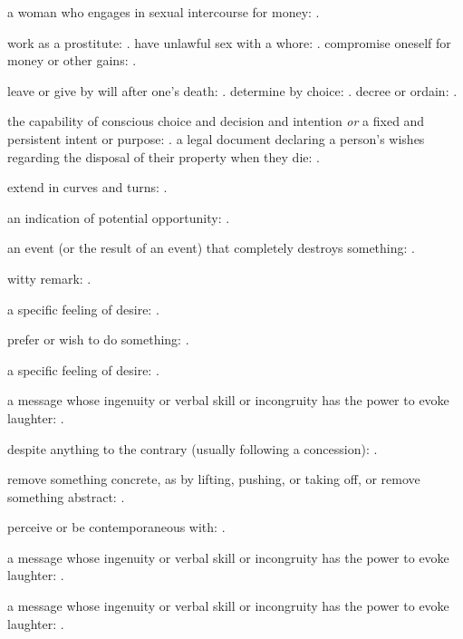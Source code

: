   a woman who engages in sexual intercourse for money: .

  work as a prostitute: . have unlawful sex with a whore: . compromise oneself for money or other gains: .

  leave or give by will after one's death: . determine by choice: . decree or ordain: .

  the capability of conscious choice and decision and intention \textit{or} a fixed and persistent intent or purpose: . a legal document declaring a person's wishes regarding the disposal of their property when they die: .

  extend in curves and turns: .

  an indication of potential opportunity: .

  an event (or the result of an event) that completely destroys something: .

  witty remark: .

  a specific feeling of desire: .

  prefer or wish to do something: .

  a specific feeling of desire: .

  a message whose ingenuity or verbal skill or incongruity has the power to evoke laughter: .

  despite anything to the contrary (usually following a concession): .

  remove something concrete, as by lifting, pushing, or taking off, or remove something abstract: .

  perceive or be contemporaneous with: .

  a message whose ingenuity or verbal skill or incongruity has the power to evoke laughter: .

  a message whose ingenuity or verbal skill or incongruity has the power to evoke laughter: .

